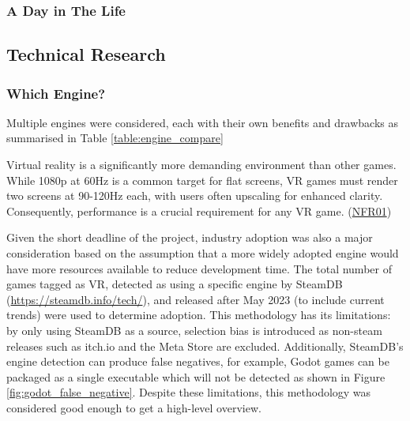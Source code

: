 \documentclass[sigconf,authordraft]{acmart}
\begin{document}
\subsubsection{A Day in The Life}

\subsection{Technical Research}

\subsubsection{Which Engine?}

Multiple engines were considered, each with their own benefits
and drawbacks as summarised in Table \ref{table:engine_compare}

Virtual reality is a significantly more demanding environment than other games.
While 1080p at 60Hz is a common target for flat screens, VR games must render
two screens at 90-120Hz each, with users often upscaling for enhanced clarity.
Consequently, performance is a crucial requirement for any VR game.
(\hyperref[sec:nfr_performance]{NFR01})

Given the short deadline of the project, industry adoption was also a major
consideration based on the assumption that a more widely adopted engine would
have more resources available to reduce development time. The total number of
games tagged as VR, detected as using a specific engine by
SteamDB (\url{https://steamdb.info/tech/}), and released
after May 2023 (to include current trends) were used to determine adoption.
This methodology has its limitations: by only using SteamDB as a source,
selection bias is introduced as non-steam releases such as itch.io and the Meta
Store are excluded. Additionally, SteamDB's engine detection can produce false
negatives, for example, Godot games can be packaged as a single executable which
will not be detected as shown in Figure \ref{fig:godot_false_negative}. Despite
these limitations, this methodology was considered good enough to get a
high-level overview.
\end{document}
